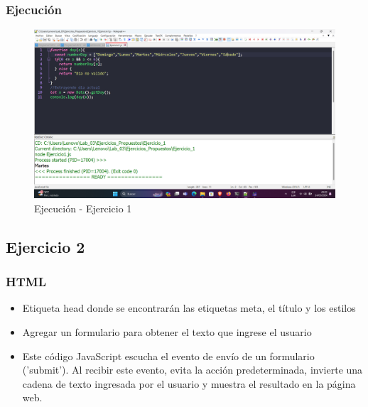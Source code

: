 \documentclass{article}
\begin{document}
    \subsubsection{Ejecución}
    \begin{figure}[H]
    	\centering
    	\includegraphics[width=1\textwidth,keepaspectratio]{img/EScript1.png}
    	\caption{Ejecución - Ejercicio 1}
    \end{figure}
    
	\subsection{Ejercicio 2}
	\subsubsection{HTML}
	\begin{itemize}
		\item Etiqueta head donde se encontrarán las etiquetas meta, el título y los estilos  
		
		\newpage
		\item Agregar un formulario para obtener el texto que ingrese el usuario
		
		\item Este código JavaScript escucha el evento de envío de un formulario ('submit'). Al recibir este evento, evita la acción predeterminada, invierte una cadena de texto ingresada por el usuario y muestra el resultado en la página web.
		
	\end{itemize}
\end{document}
